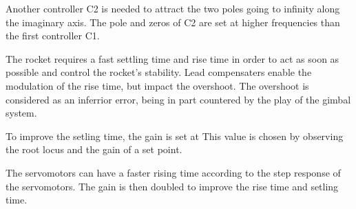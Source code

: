 Another controller C2 is needed to attract the two poles going to infinity along the imaginary axis. The pole and zeros of C2 are set at higher frequencies than the first controller C1. 


The rocket requires a fast settling time and rise time in order to act as soon as possible and control the rocket's stability. Lead compensaters enable the modulation of the rise time, but impact the overshoot. The overshoot is considered as an inferrior error, being in part countered by the play of the gimbal system. 

To improve the setling time, the gain is set at %
This value is chosen by observing the root locus and the gain of a set point.



The servomotors can have a faster rising time according to the step response of the servomotors. The gain is then doubled to improve the rise time and setling time.


